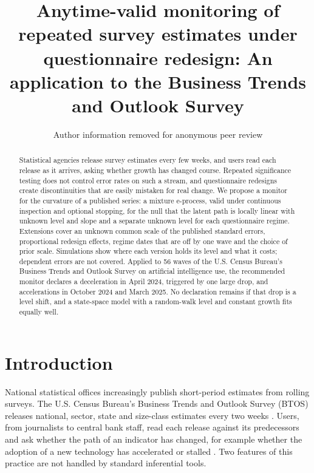 \documentclass[Afour,sageh,times]{sagej}
\theoremstyle{definition}
\begin{document}

\title{Anytime-valid monitoring of repeated survey estimates under questionnaire redesign: An application to the Business Trends and Outlook Survey}

\author{Author information removed for anonymous peer review}

\begin{abstract}
Statistical agencies release survey estimates every few weeks, and users read each release as it arrives, asking whether growth has changed course. Repeated significance testing does not control error rates on such a stream, and questionnaire redesigns create discontinuities that are easily mistaken for real change. We propose a monitor for the curvature of a published series: a mixture e-process, valid under continuous inspection and optional stopping, for the null that the latent path is locally linear with unknown level and slope and a separate unknown level for each questionnaire regime. Extensions cover an unknown common scale of the published standard errors, proportional redesign effects, regime dates that are off by one wave and the choice of prior scale. Simulations show where each version holds its level and what it costs; dependent errors are not covered. Applied to 56 waves of the U.S. Census Bureau's Business Trends and Outlook Survey on artificial intelligence use, the recommended monitor declares a deceleration in April 2024, triggered by one large drop, and accelerations in October 2024 and March 2025. No declaration remains if that drop is a level shift, and a state-space model with a random-walk level and constant growth fits equally well.
\end{abstract}


\maketitle

\section{Introduction}
\label{sec:intro}

National statistical offices increasingly publish short-period estimates from rolling surveys. The U.S. Census Bureau's Business Trends and Outlook Survey (BTOS) releases national, sector, state and size-class estimates every two weeks \citep{censusmethod2025}. Users, from journalists to central bank staff, read each release against its predecessors and ask whether the path of an indicator has changed, for example whether the adoption of a new technology has accelerated or stalled \citep{bonney2024,fed2026,mcelheran2024}. Two features of this practice are not handled by standard inferential tools.
\end{document}

